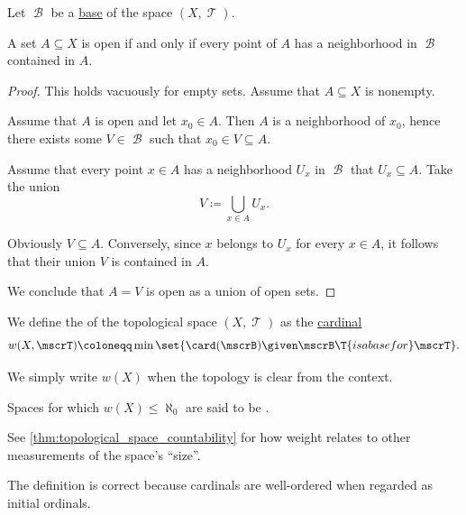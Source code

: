 \begin{proposition}\label{thm:set_open_iff_neighborhood_is_contained}
  Let \( \mscrB \) be a \hyperref[def:topological_base]{base} of the space \( (X, \mscrT) \).

  A set \( A \subseteq X \) is open if and only if every point of \( A \) has a neighborhood in \( \mscrB \) contained in \( A \).
\end{proposition}
\begin{proof}
  This holds vacuously for empty sets. Assume that \( A \subseteq X \) is nonempty.

  \SufficiencySubProof Assume that \( A \) is open and let \( x_0 \in A \). Then \( A \) is a neighborhood of \( x_0 \), hence there exists some \( V \in \mscrB \) such that \( x_0 \in V \subseteq A \).

  \NecessitySubProof Assume that every point \( x \in A \) has a neighborhood \( U_x \) in \( \mscrB \) that \( U_x \subseteq A \). Take the union
  \begin{equation*}
    V \coloneqq \bigcup_{x \in A} U_x.
  \end{equation*}

  Obviously \( V \subseteq A \). Conversely, since \( x \) belongs to \( U_x \) for every \( x \in A \), it follows that their union \( V \) is contained in \( A \).

  We conclude that \( A = V \) is open as a union of open sets.
\end{proof}

\begin{definition}\label{def:topological_space_weight}
  We define the  of the topological space \( (X, \mscrT) \) as the \hyperref[def:cardinal]{cardinal}
  \begin{equation*}
    w(X, \mscrT) \coloneqq \min \set{ \card(\mscrB) \given \mscrB \T{is a base for} \mscrT }.
  \end{equation*}

  We simply write \( w(X) \) when the topology is clear from the context.

  Spaces for which \( w(X) \leq \hyperref[def:aleph_hierarchy]{\aleph_0} \) are said to be .

  See \cref{thm:topological_space_countability} for how weight relates to other measurements of the space's \enquote{size}.
\end{definition}
\begin{defproof}
  The definition is correct because cardinals are well-ordered when regarded as initial ordinals.
\end{defproof}

